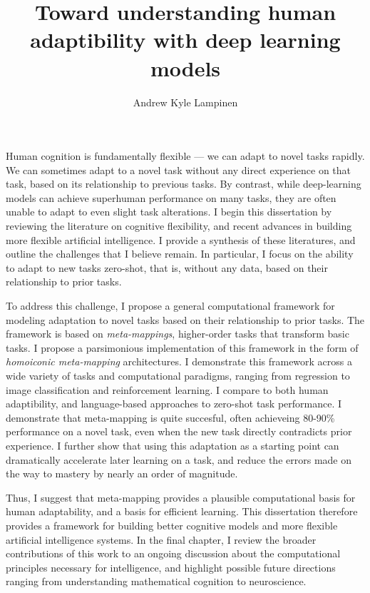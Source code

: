 \documentclass{report}
\begin{document}
\title{Toward understanding human adaptibility with deep learning models}
\author{Andrew Kyle Lampinen}

\beforepreface
\setcounter{page}{4}  %

Human cognition is fundamentally flexible --- we can adapt to novel tasks rapidly. We can sometimes adapt to a novel task without any direct experience on that task, based on its relationship to previous tasks. By contrast, while deep-learning models can achieve superhuman performance on many tasks, they are often unable to adapt to even slight task alterations. I begin this dissertation by reviewing the literature on cognitive flexibility, and recent advances in building more flexible artificial intelligence. I provide a synthesis of these literatures, and outline the challenges that I believe remain. In particular, I focus on the ability to adapt to new tasks zero-shot, that is, without any data, based on their relationship to prior tasks.\par
To address this challenge, I propose a general computational framework for modeling adaptation to novel tasks based on their relationship to prior tasks. The framework is based on \emph{meta-mappings}, higher-order tasks that transform basic tasks. I propose a parsimonious implementation of this framework in the form of \emph{homoiconic meta-mapping} architectures. I demonstrate this framework across a wide variety of tasks and computational paradigms, ranging from regression to image classification and reinforcement learning. I compare to both human adaptibility, and language-based approaches to zero-shot task performance. I demonstrate that meta-mapping is quite succesful, often achieveing 80-90\% performance on a novel task, even when the new task directly contradicts prior experience. I further show that using this adaptation as a starting point can dramatically accelerate later learning on a task, and reduce the errors made on the way to mastery by nearly an order of magnitude. \par
Thus, I suggest that meta-mapping provides a plausible computational basis for human adaptability, and a basis for efficient learning. This dissertation therefore provides a framework for building better cognitive models and more flexible artificial intelligence systems. In the final chapter, I review the broader contributions of this work to an ongoing discussion about the computational principles necessary for intelligence, and highlight possible future directions ranging from understanding mathematical cognition to neuroscience. 
\end{document}
